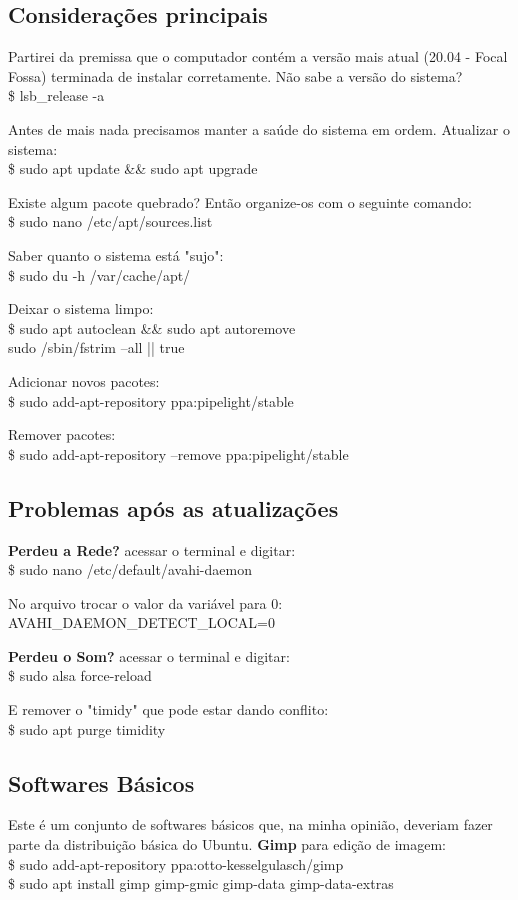 \documentclass[a4paper,11pt]{article}
\begin{document}
\subsection{Considerações principais}
Partirei da premissa que o computador contém a versão mais atual (20.04 - Focal Fossa) terminada de instalar corretamente. Não sabe a versão do sistema? \\
{\ttfamily\$ lsb\_release -a}

Antes de mais nada precisamos manter a saúde do sistema em ordem. Atualizar o sistema: \\
{\ttfamily\$ sudo apt update \&\& sudo apt upgrade}

Existe algum pacote quebrado? Então organize-os com o seguinte comando: \\
{\ttfamily\$ sudo nano /etc/apt/sources.list}

Saber quanto o sistema está "sujo": \\
{\ttfamily\$ sudo du -h /var/cache/apt/}

Deixar o sistema limpo: \\
{\ttfamily\$ sudo apt autoclean \&\& sudo apt autoremove \\
sudo /sbin/fstrim --all || true}

Adicionar novos pacotes: \\
{\ttfamily\$ sudo add-apt-repository ppa:pipelight/stable}

Remover pacotes: \\
{\ttfamily\$ sudo add-apt-repository --remove ppa:pipelight/stable}

\subsection{Problemas após as atualizações}
\textbf{Perdeu a Rede?} acessar o terminal e digitar: \\
{\ttfamily\$ sudo nano /etc/default/avahi-daemon}

No arquivo trocar o valor da variável para 0: \\
{\ttfamily AVAHI\_DAEMON\_DETECT\_LOCAL=0}

\textbf{Perdeu o Som?} acessar o terminal e digitar: \\
{\ttfamily\$ sudo alsa force-reload}

E remover o "timidy" que pode estar dando conflito: \\
{\ttfamily\$ sudo apt purge timidity}

\subsection{Softwares Básicos}
Este é um conjunto de softwares básicos que, na minha opinião, deveriam fazer parte da distribuição básica do Ubuntu. \textbf{Gimp} para edição de imagem: \\
{\ttfamily\$ sudo add-apt-repository ppa:otto-kesselgulasch/gimp} \\
{\ttfamily\$ sudo apt install gimp gimp-gmic gimp-data gimp-data-extras}
\end{document}
